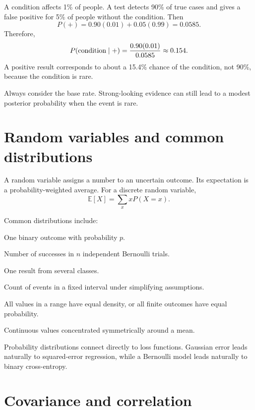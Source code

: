 \begin{workedexample}
A condition affects 1\% of people. A test detects 90\% of true cases and gives a false positive for 5\% of people without the condition. Then
\[
P(+)=0.90(0.01)+0.05(0.99)=0.0585.
\]
Therefore,
\[
P(\text{condition}\mathrel{|} +)=\frac{0.90(0.01)}{0.0585}\approx0.154.
\]
A positive result corresponds to about a 15.4\% chance of the condition, not 90\%, because the condition is rare.
\end{workedexample}

\begin{keyidea}
Always consider the base rate. Strong-looking evidence can still lead to a modest posterior probability when the event is rare.
\end{keyidea}

\section{Random variables and common distributions}

A random variable assigns a number to an uncertain outcome. Its expectation is a probability-weighted average. For a discrete random variable,
\[
  \mathbb{E}[X]=\sum_x xP(X=x).
\]

Common distributions include:

\begin{description}[leftmargin=1.25in,style=nextline]
  \item[Bernoulli] One binary outcome with probability $p$.
  \item[Binomial] Number of successes in $n$ independent Bernoulli trials.
  \item[Categorical] One result from several classes.
  \item[Poisson] Count of events in a fixed interval under simplifying assumptions.
  \item[Uniform] All values in a range have equal density, or all finite outcomes have equal probability.
  \item[Normal] Continuous values concentrated symmetrically around a mean.
\end{description}

Probability distributions connect directly to loss functions. Gaussian error leads naturally to squared-error regression, while a Bernoulli model leads naturally to binary cross-entropy.

\section{Covariance and correlation}
\label{sec:correlation}


